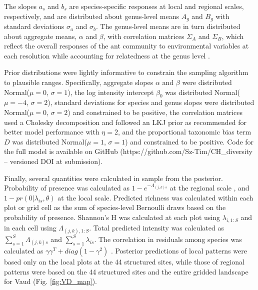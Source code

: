 \documentclass[preprint,review,times,12pt]{elsarticle}
\begin{document}
The slopes $a_s$ and $b_s$ are species-specific responses at local and regional scales, respectively, and are distributed about genus-level means $A_g$ and $B_g$ with standard deviations $\sigma_a$ and $\sigma_b$. The genus-level means are in turn distributed about aggregate means, $\alpha$ and $\beta$, with correlation matrices $\Sigma_A$ and $\Sigma_B$, which reflect the overall responses of the ant community to environmental variables at each resolution while accounting for relatedness at the genus level \citep{Hadfield2010b,Ovaskainen2011,Szewczyk2018,Caradima2019}.

Prior distributions were lightly informative to constrain the sampling algorithm to plausible ranges. Specifically, aggregate slopes $\alpha$ and $\beta$ were distributed Normal($\mu=0$, $\sigma=1$), the log intensity intercept $\beta_0$ was distributed Normal($\mu=-4$, $\sigma=2$), standard deviations for species and genus slopes were distributed Normal($\mu=0$, $\sigma=2$) and constrained to be positive, the correlation matrices used a Cholesky decomposition and followed an LKJ prior as recommended for better model performance \citep{Carpenter2017,Caradima2019} with $\eta=2$, and the proportional taxonomic bias term $D$ was distributed Normal($\mu=1$, $\sigma=1$) and constrained to be positive. Code for the full model is available on GitHub (https://github.com/Sz-Tim/CH\_diversity -- versioned DOI at submission).

Finally, several quantities were calculated in sample from the posterior. Probability of presence was calculated as $1 - e^{-\Lambda_{(j,k)s}}$ at the regional scale \citep{Hefley2016}, and $1 - pr(0 | \lambda_{is}, \theta)$ at the local scale. Predicted richness was calculated within each plot or grid cell as the sum of species-level Bernoulli draws based on the probability of presence. Shannon's H was calculated at each plot using $\lambda_{i,1:S}$ and in each cell using $\Lambda_{(j,k),1:S}$. Total predicted intensity was calculated as $\sum_{s=1}^{S}\Lambda_{(j,k)s}$ and $\sum_{s=1}^{S}\lambda_{is}$. The correlation in residuals among species was calculated as $\gamma \gamma^T + diag(1 - \gamma^2)$ \citep{Tobler2019}. Posterior predictions of local patterns were based only on the local plots at the 44 structured sites, while those of regional patterns were based on the 44 structured sites and the entire gridded landscape for Vaud (Fig. \ref{fig:VD_map}). 
\end{document}
